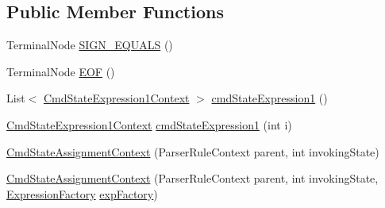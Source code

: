 \subsection*{Public Member Functions}
\begin{DoxyCompactItemize}
\item 
Terminal\+Node \hyperlink{classgov_1_1nasa_1_1jpf_1_1inspector_1_1server_1_1expression_1_1parser_1_1_expression_grammar_padaf6f2235297f2d833b81c76746458f3_a99a0f166407490724579e3e2829906b6}{S\+I\+G\+N\+\_\+\+E\+Q\+U\+A\+LS} ()
\item 
Terminal\+Node \hyperlink{classgov_1_1nasa_1_1jpf_1_1inspector_1_1server_1_1expression_1_1parser_1_1_expression_grammar_padaf6f2235297f2d833b81c76746458f3_ac3854ab6a905fbf4816f28ae7d047d50}{E\+OF} ()
\item 
List$<$ \hyperlink{classgov_1_1nasa_1_1jpf_1_1inspector_1_1server_1_1expression_1_1parser_1_1_expression_grammar_pa1eb341e049a8047f26aa8b84266a8b94}{Cmd\+State\+Expression1\+Context} $>$ \hyperlink{classgov_1_1nasa_1_1jpf_1_1inspector_1_1server_1_1expression_1_1parser_1_1_expression_grammar_padaf6f2235297f2d833b81c76746458f3_a27561ffb8b79aedd8437695bed084cfc}{cmd\+State\+Expression1} ()
\item 
\hyperlink{classgov_1_1nasa_1_1jpf_1_1inspector_1_1server_1_1expression_1_1parser_1_1_expression_grammar_pa1eb341e049a8047f26aa8b84266a8b94}{Cmd\+State\+Expression1\+Context} \hyperlink{classgov_1_1nasa_1_1jpf_1_1inspector_1_1server_1_1expression_1_1parser_1_1_expression_grammar_padaf6f2235297f2d833b81c76746458f3_ab68003baf8fa515f3536b1ed9aea976a}{cmd\+State\+Expression1} (int i)
\item 
\hyperlink{classgov_1_1nasa_1_1jpf_1_1inspector_1_1server_1_1expression_1_1parser_1_1_expression_grammar_padaf6f2235297f2d833b81c76746458f3_adb2ad6d878a4d4fbcb507522b9d407ef}{Cmd\+State\+Assignment\+Context} (Parser\+Rule\+Context parent, int invoking\+State)
\item 
\hyperlink{classgov_1_1nasa_1_1jpf_1_1inspector_1_1server_1_1expression_1_1parser_1_1_expression_grammar_padaf6f2235297f2d833b81c76746458f3_aed41975f7036cb26f0fb0ea991276ecb}{Cmd\+State\+Assignment\+Context} (Parser\+Rule\+Context parent, int invoking\+State, \hyperlink{classgov_1_1nasa_1_1jpf_1_1inspector_1_1server_1_1expression_1_1_expression_factory}{Expression\+Factory} \hyperlink{classgov_1_1nasa_1_1jpf_1_1inspector_1_1server_1_1expression_1_1parser_1_1_expression_grammar_padaf6f2235297f2d833b81c76746458f3_a2db8b19fdafeba3f1438555020ec951e}{exp\+Factory})
\item 

\end{DoxyCompactItemize}
